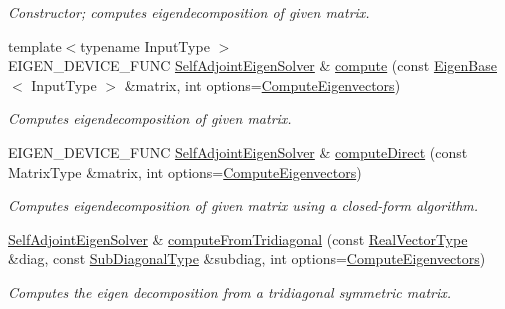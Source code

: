 \begin{DoxyCompactItemize}
\begin{DoxyCompactList}\small\item\em Constructor; computes eigendecomposition of given matrix. \end{DoxyCompactList}\item 
{\footnotesize template$<$typename Input\+Type $>$ }\\E\+I\+G\+E\+N\+\_\+\+D\+E\+V\+I\+C\+E\+\_\+\+F\+U\+NC \hyperlink{group___eigenvalues___module_class_eigen_1_1_self_adjoint_eigen_solver}{Self\+Adjoint\+Eigen\+Solver} \& \hyperlink{group___eigenvalues___module_a88bcdc24112efa7c4d2ebb3476efcbe9}{compute} (const \hyperlink{group___core___module_struct_eigen_1_1_eigen_base}{Eigen\+Base}$<$ Input\+Type $>$ \&matrix, int options=\hyperlink{group__enums_ggae3e239fb70022eb8747994cf5d68b4a9ada93d8885bde32b876ba4af01d3292cc}{Compute\+Eigenvectors})
\begin{DoxyCompactList}\small\item\em Computes eigendecomposition of given matrix. \end{DoxyCompactList}\item 
E\+I\+G\+E\+N\+\_\+\+D\+E\+V\+I\+C\+E\+\_\+\+F\+U\+NC \hyperlink{group___eigenvalues___module_class_eigen_1_1_self_adjoint_eigen_solver}{Self\+Adjoint\+Eigen\+Solver} \& \hyperlink{group___eigenvalues___module_a569559c353a41476c72feffc3416d8f6}{compute\+Direct} (const Matrix\+Type \&matrix, int options=\hyperlink{group__enums_ggae3e239fb70022eb8747994cf5d68b4a9ada93d8885bde32b876ba4af01d3292cc}{Compute\+Eigenvectors})
\begin{DoxyCompactList}\small\item\em Computes eigendecomposition of given matrix using a closed-\/form algorithm. \end{DoxyCompactList}\item 
\hyperlink{group___eigenvalues___module_class_eigen_1_1_self_adjoint_eigen_solver}{Self\+Adjoint\+Eigen\+Solver} \& \hyperlink{group___eigenvalues___module_a7ddbdf83230fc4a65a097d9405e3752d}{compute\+From\+Tridiagonal} (const \hyperlink{group___eigenvalues___module_acd090d5fdfc3cc017a13b6d8daa92287}{Real\+Vector\+Type} \&diag, const \hyperlink{group___core___module_class_eigen_1_1_matrix}{Sub\+Diagonal\+Type} \&subdiag, int options=\hyperlink{group__enums_ggae3e239fb70022eb8747994cf5d68b4a9ada93d8885bde32b876ba4af01d3292cc}{Compute\+Eigenvectors})
\begin{DoxyCompactList}\small\item\em Computes the eigen decomposition from a tridiagonal symmetric matrix. \end{DoxyCompactList}\item 

\end{DoxyCompactItemize}

